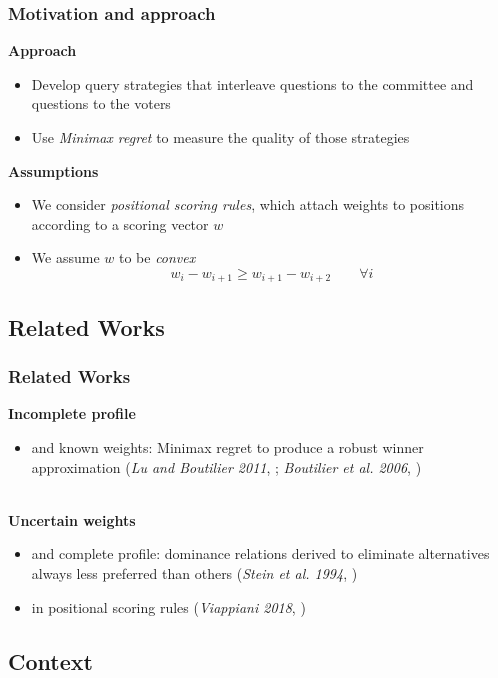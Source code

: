 \documentclass{beamer}
\begin{document}
\begin{frame}
	\frametitle{Motivation and approach}
	 \textbf{Approach}
	\begin{itemize}
		\item Develop query strategies that interleave questions to the committee and questions to the voters
		\item Use \emph{Minimax regret} to measure the quality of those strategies
	\end{itemize}
	 \textbf{Assumptions}
	\begin{itemize}
		\item We consider \textit{positional scoring rules}, which attach weights to positions according to a scoring vector $w$
		\item We assume $w$ to be \textit{convex}
		\[ w_i - w_{i+1} \geq w_{i+1}-w_{i+2} \qquad \forall i\]
	\end{itemize}	
\end{frame}

\subsection{Related Works}
\begin{frame}
	\frametitle{Related Works}
	\textbf{Incomplete profile}  
	\begin{itemize}
		\item and known weights: Minimax regret to produce a robust winner approximation (\textit{Lu and Boutilier 2011}, \cite{Lu2011}; \textit{Boutilier et al. 2006}, \cite{Boutilier2006})
	\end{itemize}~\\
	\textbf{Uncertain weights} 
	\begin{itemize}
		\item and complete profile: dominance relations derived to eliminate alternatives always less preferred than others (\textit{Stein et al. 1994}, \cite{Stein1994})
		\item in positional scoring rules (\textit{Viappiani 2018}, \cite{Viappiani2018})
	\end{itemize}
\end{frame}

\subsection{Context}
\end{document}
